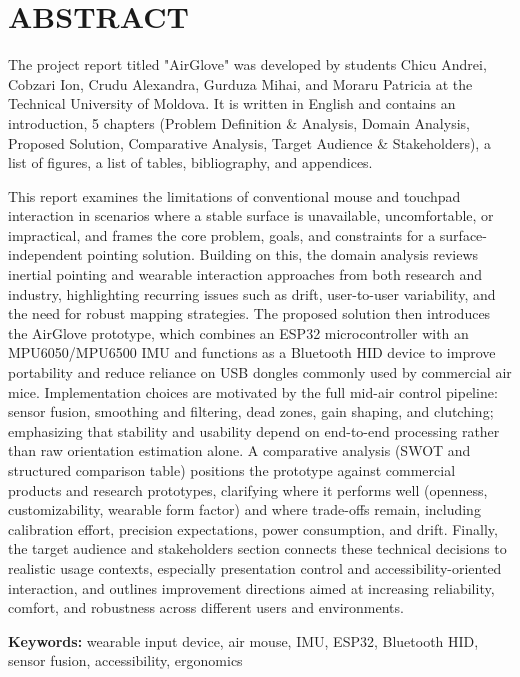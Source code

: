 \chapter*{ABSTRACT}
\thispagestyle{empty}

The project report titled "AirGlove" was developed by students Chicu Andrei, Cobzari Ion, Crudu Alexandra, Gurduza Mihai, and Moraru Patricia at the Technical University of Moldova. It is written in English and contains an introduction, 5 chapters (Problem Definition \& Analysis, Domain Analysis, Proposed Solution, Comparative Analysis, Target Audience \& Stakeholders), a list of figures, a list of tables, bibliography, and appendices.

This report examines the limitations of conventional mouse and touchpad interaction in scenarios where a stable surface is unavailable, uncomfortable, or impractical, and frames the core problem, goals, and constraints for a surface-independent pointing solution. Building on this, the domain analysis reviews inertial pointing and wearable interaction approaches from both research and industry, highlighting recurring issues such as drift, user-to-user variability, and the need for robust mapping strategies. The proposed solution then introduces the AirGlove prototype, which combines an ESP32 microcontroller with an MPU6050/MPU6500 IMU and functions as a Bluetooth HID device to improve portability and reduce reliance on USB dongles commonly used by commercial air mice. Implementation choices are motivated by the full mid-air control pipeline: sensor fusion, smoothing and filtering, dead zones, gain shaping, and clutching; emphasizing that stability and usability depend on end-to-end processing rather than raw orientation estimation alone. A comparative analysis (SWOT and structured comparison table) positions the prototype against commercial products and research prototypes, clarifying where it performs well (openness, customizability, wearable form factor) and where trade-offs remain, including calibration effort, precision expectations, power consumption, and drift. Finally, the target audience and stakeholders section connects these technical decisions to realistic usage contexts, especially presentation control and accessibility-oriented interaction, and outlines improvement directions aimed at increasing reliability, comfort, and robustness across different users and environments.

\textbf{Keywords: } wearable input device, air mouse, IMU, ESP32, Bluetooth HID, sensor fusion, accessibility, ergonomics